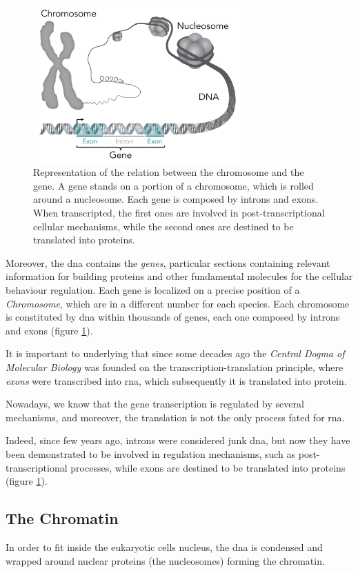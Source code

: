 \begin{figure}[h]
\centering
\includegraphics[width=8cm, keepaspectratio]{img/intro/gene_chrom.png}
\caption[Gene Chromosome relation]{Representation of the relation between the chromosome and the gene. 
A gene stands on a portion of a chromosome, which is rolled around a nucleosome.
Each gene is composed by introns and exons. When transcripted, the first ones are involved in post-transcriptional cellular mechanisms, while the second ones are destined to be translated into proteins.}
\label{fig:dnachromgene}
\end{figure}

Moreover, the \gls{dna} contains the \textit{genes}, particular sections containing relevant information for building proteins and other fundamental molecules for the cellular behaviour regulation.
Each gene is localized on a precise position of a \textit{Chromosome}, which are in a different number for each species.
Each chromosome is constituted by \gls{dna} within thousands of genes, each one composed by introns and exons (figure \ref{fig:dnachromgene}).

It is important to underlying that since some decades ago the \textit{Central Dogma of Molecular Biology} was founded on the transcription-translation principle, where \textit{exons} were transcribed into \gls{rna}, which subsequently it is translated into protein.

Nowadays, we know that the gene transcription is regulated by several mechanisms, and moreover, the translation is not the only process fated for \gls{rna}.

Indeed, since few years ago, introns were considered junk \gls{dna}, but now they have been demonstrated to be involved in regulation mechanisms, such as post-transcriptional processes, while exons are destined to be translated into proteins (figure \ref{fig:dnachromgene}).


\subsection{The Chromatin}
\label{sec:chromatin}
In order to fit inside the eukaryotic cells nucleus, the \gls{dna} is condensed and wrapped around nuclear proteins (the nucleosomes) forming the chromatin.

